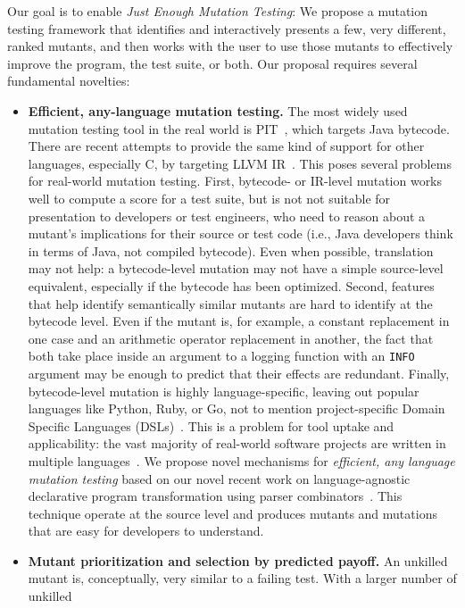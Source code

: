 Our goal is to enable \emph{Just Enough Mutation Testing}: We propose a mutation
testing framework that identifies and interactively presents a few, very
different, ranked mutants, and then works with the user to use those mutants to
effectively improve the program, the test suite, or both.  Our proposal requires
several fundamental novelties:
\begin{itemize}
\item \textbf{Efficient, any-language mutation testing.}  The most widely used
  mutation testing tool in the real world is PIT~\cite{pittest}, which targets
  Java bytecode.  There are recent attempts to provide the same kind of support
  for other languages, especially C, by targeting LLVM IR~\cite{HaririLLVM}.
  This poses several problems for real-world mutation testing.  First, bytecode-
  or IR-level mutation works well to compute a score for a test suite, but is
  not not suitable for presentation to developers or test engineers, who need to
  reason about a mutant's implications for their source or test code (i.e., Java
  developers think in terms of Java, not compiled bytecode).  Even when
  possible, translation may not help: a bytecode-level mutation may not have a
  simple source-level equivalent, especially if the bytecode has been optimized.
  Second, features that help identify semantically similar mutants are hard to
  identify at the bytecode level.  Even if the mutant is, for example, a
  constant replacement in one case and an arithmetic operator replacement in
  another, the fact that both take place inside an argument to a logging
  function with an {\tt INFO} argument may be enough to predict that their
  effects are redundant.  Finally, bytecode-level mutation is highly
  language-specific, leaving out popular languages like Python, Ruby, or Go, not
  to mention project-specific Domain Specific Languages (DSLs)~\cite{Fow10}.
  This is a problem for tool uptake and applicability: the vast majority of
  real-world software projects are written in multiple languages~\cite{Ray2014}.
  We propose novel mechanisms for \emph{efficient, any language mutation
    testing} based on our novel recent work on language-agnostic declarative
  program transformation using parser combinators~\cite{rvt-ppc}.  This
  technique operate at the source level and produces mutants and mutations that
  are easy for developers to understand. 
\item \textbf{Mutant prioritization and selection by predicted payoff.}
An unkilled mutant is, conceptually, very similar to a failing test.
With a larger number of unkilled

\end{itemize}
